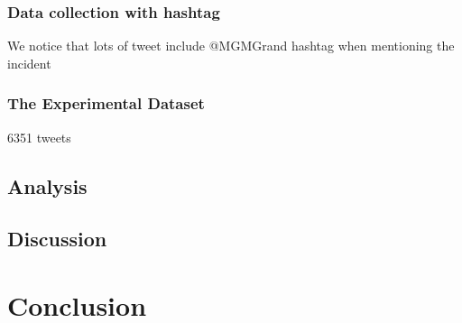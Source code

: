 \subsubsection{Data collection with hashtag}
We notice that lots of tweet include @MGMGrand hashtag when mentioning the incident
\subsubsection{The Experimental Dataset}
6351 tweets
\subsection{Analysis}

\subsection{Discussion}

\section{Conclusion}